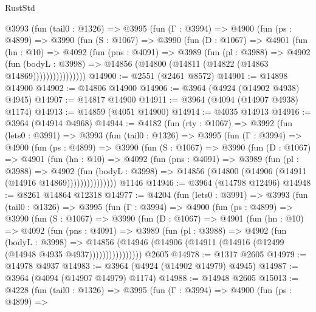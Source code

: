 \begin{lexlean}{RustStd}
\begin{coremodule}
        @3993
          (fun (tail0 : @1326) =>
          @3995
            (fun (Γ : @3994) =>
            @4900
              (fun (ps : @4899) =>
              @3990
                (fun (S : @1067) =>
                @3990
                  (fun (D : @1067) =>
                  @4901
                    (fun (hn : @10) =>
                    @4092
                      (fun (pns : @4091) =>
                      @3989
                        (fun (pl : @3988) =>
                        @4902
                          (fun (bodyL : @3998) =>
                          @14856 (@14800 (@14811 (@14822 (@14863 @14869))))))))))))))))
@14900 := @2551 (@2461 @8572)
@14901 := @14898 @14900
@14902 := @14806 @14900
@14906 := @3964 (@4924 (@14902 @4938) @4945)
@14907 := @14817 @14900
@14911 := @3964 (@4094 (@14907 @4938) @1174)
@14913 := @14859 (@4051 @14900)
@14914 := @4035 @14913
@14916 := @3964 (@14914 @4968)
@14944 := @4182
    (fun (rty : @1067) =>
    @3992
      (fun (lets0 : @3991) =>
      @3993
        (fun (tail0 : @1326) =>
        @3995
          (fun (Γ : @3994) =>
          @4900
            (fun (ps : @4899) =>
            @3990
              (fun (S : @1067) =>
              @3990
                (fun (D : @1067) =>
                @4901
                  (fun (hn : @10) =>
                  @4092
                    (fun (pns : @4091) =>
                    @3989
                      (fun (pl : @3988) =>
                      @4902
                        (fun (bodyL : @3998) =>
                        @14856 (@14800 (@14906 (@14911 (@14916 @14869)))))))))))))))
    @1146
@14946 := @3964 (@14798 @12496)
@14948 := @8261 @14864 @12318
@14977 := @4204
    (fun (lets0 : @3991) =>
    @3993
      (fun (tail0 : @1326) =>
      @3995
        (fun (Γ : @3994) =>
        @4900
          (fun (ps : @4899) =>
          @3990
            (fun (S : @1067) =>
            @3990
              (fun (D : @1067) =>
              @4901
                (fun (hn : @10) =>
                @4092
                  (fun (pns : @4091) =>
                  @3989
                    (fun (pl : @3988) =>
                    @4902
                      (fun (bodyL : @3998) =>
                      @14856
                        (@14946 (@14906 (@14911 (@14916 (@12499 (@14948 @4935 @4937))))))))))))))))
    @2605
@14978 := @1317 @2605
@14979 := @14978 @4937
@14983 := @3964 (@4924 (@14902 @14979) @4945)
@14987 := @3964 (@4094 (@14907 @14979) @1174)
@14988 := @14948 @2605
@15013 := @4228
    (fun (tail0 : @1326) =>
    @3995
      (fun (Γ : @3994) =>
      @4900
        (fun (ps : @4899) =>

\end{coremodule}
\end{lexlean}
